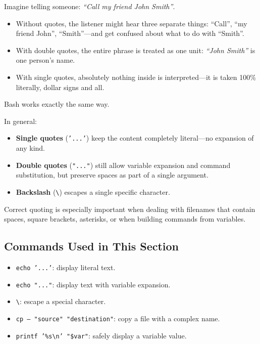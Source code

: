 \begin{examplebox}
  Imagine telling someone: \textit{``Call my friend John Smith''}.
  \begin{itemize}
    \item Without quotes, the listener might hear three separate things:
      ``Call'', ``my friend John'', ``Smith''---and get confused about what
      to do with ``Smith''.
    \item With double quotes, the entire phrase is treated as one unit:
      \textit{``John Smith''} is one person's name.
    \item With single quotes, absolutely nothing inside is interpreted---it is
      taken 100\% literally, dollar signs and all.
  \end{itemize}
  Bash works exactly the same way.
\end{examplebox}

In general:
\begin{itemize}
  \item \textbf{Single quotes} (\texttt{'...'}) keep the content completely
    literal---no expansion of any kind.
  \item \textbf{Double quotes} (\texttt{"..."}) still allow variable
    expansion and command substitution, but preserve spaces as part of a
    single argument.
  \item \textbf{Backslash} (\texttt{\textbackslash}) escapes a single
    specific character.
\end{itemize}

Correct quoting is especially important when dealing with filenames that
contain spaces, square brackets, asterisks, or when building commands from
variables.

\subsection*{Commands Used in This Section}

\begin{itemize}
  \item \texttt{echo '...'}: display literal text.
  \item \texttt{echo "..."}: display text with variable expansion.
  \item \texttt{\textbackslash}: escape a special character.
  \item \texttt{cp -- "source" "destination"}: copy a file with a complex name.
  \item \texttt{printf '\%s\textbackslash n' "\$var"}: safely display a variable value.
\end{itemize}

